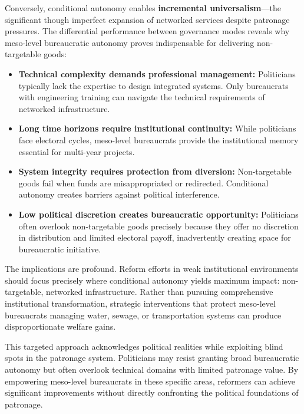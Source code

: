 Conversely, conditional autonomy enables \textbf{incremental universalism}—the significant though imperfect expansion of networked services despite patronage pressures.
The differential performance between governance modes reveals why meso-level bureaucratic autonomy proves indispensable for delivering non-targetable goods:

\begin{itemize}
    \item \textbf{Technical complexity demands professional management:} Politicians typically lack the expertise to design integrated systems. Only bureaucrats with engineering training can navigate the technical requirements of networked infrastructure.
    
    \item \textbf{Long time horizons require institutional continuity:} While politicians face electoral cycles, meso-level bureaucrats provide the institutional memory essential for multi-year projects.
    
    \item \textbf{System integrity requires protection from diversion:} Non-targetable goods fail when funds are misappropriated or redirected. Conditional autonomy creates barriers against political interference.
    
    \item \textbf{Low political discretion creates bureaucratic opportunity:} Politicians often overlook non-targetable goods precisely because they offer no discretion in distribution and limited electoral payoff, inadvertently creating space for bureaucratic initiative.
\end{itemize}

The implications are profound. Reform efforts in weak institutional environments should focus precisely where conditional autonomy yields maximum impact: non-targetable, networked infrastructure. Rather than pursuing comprehensive institutional transformation, strategic interventions that protect meso-level bureaucrats managing water, sewage, or transportation systems can produce disproportionate welfare gains.

This targeted approach acknowledges political realities while exploiting blind spots in the patronage system. Politicians may resist granting broad bureaucratic autonomy but often overlook technical domains with limited patronage value. By empowering meso-level bureaucrats in these specific areas, reformers can achieve significant improvements without directly confronting the political foundations of patronage.

